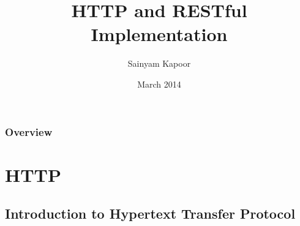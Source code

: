 \documentclass{beamer}
\title[HTTP and REST]{HTTP and RESTful Implementation} %
\author{Sainyam Kapoor} %
\institute[IIT-(BHU)] %
{\texttt{[image: IITBHU\_Logo\_Matlab.png]}\\
Indian Institute of Technology-(BHU),Varanasi \\ %
\medskip

\textit{sainyam.kapoor.cse12@iitbhu.ac.in} %
}
\date{March 2014} %
\begin{document}
\begin{frame}
\titlepage %
\end{frame}

\begin{frame}
\frametitle{Overview} %
\tableofcontents %
\end{frame}


\section{HTTP} %

\subsection{Introduction to Hypertext Transfer Protocol} %
\end{document}
